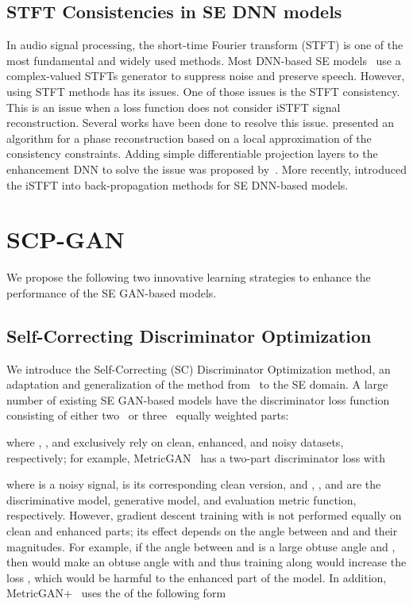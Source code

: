 \documentclass{article}
\begin{document}
\subsection{STFT Consistencies in SE DNN models}

In audio signal processing, the short-time Fourier transform (STFT) is one of the most fundamental and widely used methods. Most DNN-based SE models~\cite{Wisdom2019DifferentiableCC, cao2022cmgan, le2010fast} use a complex-valued STFTs generator to suppress noise and preserve speech. However, using STFT methods has its issues. One of those issues is the STFT consistency. This is an issue when a loss function does not consider iSTFT signal reconstruction.
Several works have been done to resolve this issue. \cite{le2010fast} presented an algorithm for a phase reconstruction based on a local approximation of the consistency constraints. Adding simple differentiable projection layers to the enhancement DNN to solve the issue was proposed by~\cite{Wisdom2019DifferentiableCC}. More recently, \cite{Braun2021TowardsEM} introduced the iSTFT into back-propagation methods for SE DNN-based models.


\section{SCP-GAN}\label{sec:scpgan}
We propose the following two innovative learning strategies to enhance the performance of the SE GAN-based models. 


\subsection{Self-Correcting Discriminator Optimization}\label{ss:scdo}

We introduce the Self-Correcting (SC) Discriminator Optimization method, an adaptation and generalization of the method from~\cite{Zadorozhnyy_2021_CVPR} to the SE domain. A large number of existing SE GAN-based models have the discriminator loss function consisting
of either two~\cite{pmlr-v97-fu19b, cao2022cmgan} or three~\cite{fu2021metricgan+} equally weighted parts: 


where , , and  exclusively rely on clean, enhanced, and noisy datasets, respectively; for example, MetricGAN~\cite{pmlr-v97-fu19b} has a two-part discriminator loss with 


where  is a noisy signal,  is its corresponding clean version, and , , and  are the discriminative model, generative model, and evaluation metric function, respectively. However, gradient descent training with   is not performed equally on clean and enhanced parts; its effect depends on the angle between  and  and their magnitudes. For example, if the angle between  and  is a large obtuse angle and , then  would make an obtuse angle with  and thus training along  would increase the loss , which would be harmful to the enhanced part of the model. In addition, MetricGAN+~\cite{fu2021metricgan+} uses the  of the following form
\end{document}

